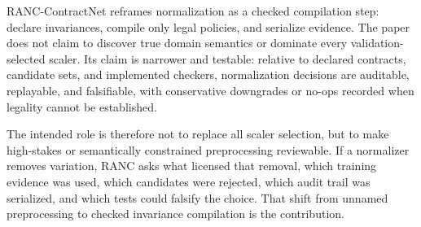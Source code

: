 \documentclass{article}
\begin{document}
RANC-ContractNet reframes normalization as a checked compilation step: declare
invariances, compile only legal policies, and serialize evidence. The paper does
not claim to discover true domain semantics or dominate every validation-selected
scaler. Its claim is narrower and testable: relative to declared contracts,
candidate sets, and implemented checkers, normalization decisions are auditable,
replayable, and falsifiable, with conservative downgrades or no-ops recorded
when legality cannot be established.

The intended role is therefore not to replace all scaler selection, but to make
high-stakes or semantically constrained preprocessing reviewable. If a
normalizer removes variation, RANC asks what licensed that removal, which
training evidence was used, which candidates were rejected, which audit trail
was serialized, and which tests could falsify the choice. That shift from
unnamed preprocessing to checked invariance compilation is the contribution.

\begingroup
\scriptsize
\setlength{\itemsep}{0pt}
\setlength{\parskip}{0pt}


\endgroup
\end{document}
